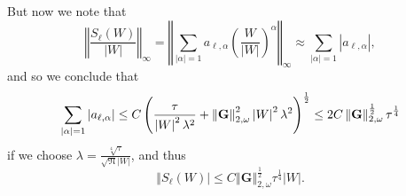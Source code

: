\documentclass{amsart}
\theoremstyle{plain}
\numberwithin{equation}{section}
\begin{document}
But now we note that 
\begin{equation*}
\left\Vert \frac{S_{\ell }\left( W\right) }{\left\vert W\right\vert }%
\right\Vert _{\infty }=\left\Vert \sum_{\left\vert \alpha \right\vert
=1}a_{\ell ,\alpha }\left( \frac{W}{\left\vert W\right\vert }\right)
^{\alpha }\right\Vert _{\infty }\approx \sum_{\left\vert \alpha \right\vert
=1}\left\vert a_{\ell ,\alpha }\right\vert ,
\end{equation*}%
and so we conclude that%
\begin{equation*}
\sum_{\left\vert \alpha \right\vert =1}\left\vert a_{\ell ,\alpha
}\right\vert \leq C\left( \frac{\tau }{\left\vert W\right\vert ^{2}\lambda
^{2}}+\left\Vert \mathbf{G}\right\Vert _{2,\omega }^{2}\left\vert
W\right\vert ^{2}\lambda ^{2}\right) ^{\frac{1}{2}}\leq 2C\left\Vert \mathbf{%
G}\right\Vert _{2,\omega }^{\frac{1}{2}}\tau ^{\frac{1}{4}}
\end{equation*}%
if we choose $\lambda =\frac{\sqrt[4]{\tau }}{\sqrt{\mathfrak{N}}\left\vert
W\right\vert }$, and thus 
\begin{equation*}
\left\Vert S_{\ell }\left( W\right) \right\vert \leq C\left\Vert \mathbf{G}%
\right\Vert _{2,\omega }^{\frac{1}{2}}\tau ^{\frac{1}{4}}|W|.
\end{equation*}
\end{document}
